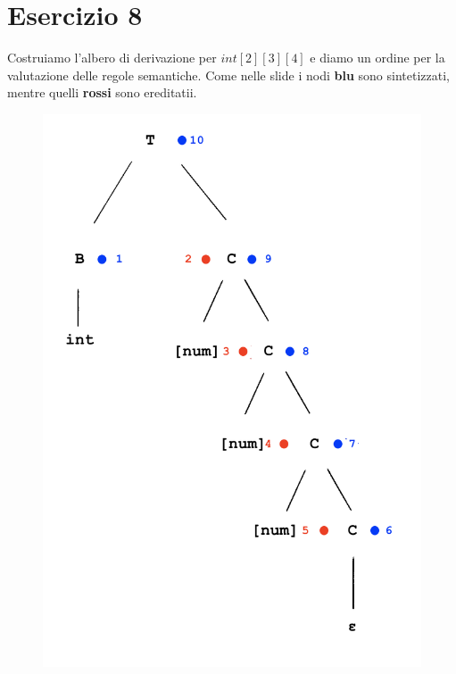 \documentclass[11pt]{article}
\begin{document}
\section*{Esercizio 8}
Costruiamo l'albero di derivazione per $int[2][3][4]$ e diamo un ordine per la valutazione delle regole semantiche.
Come nelle slide i nodi {\color{blue} \textbf{blu}} sono sintetizzati, mentre quelli {\color {red} \textbf{rossi}} 
sono ereditatii. 
\begin{center}
  \begin{minipage}[t]{\linewidth}
    \begin{multicols}{2}
      \begin{figure}[H]
        \includegraphics[width=\linewidth]{./img/08DerivationTree.png}
      \end{figure}
      \begin{enumerate}

\end{enumerate}
\end{multicols}
\end{minipage}
\end{center}
\end{document}
